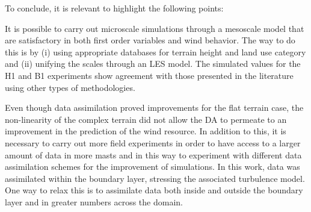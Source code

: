 To conclude, it is relevant to highlight the following points:
\begin{itemize*}
\item It is possible to carry out microscale simulations through a mesoscale model that are satisfactory in both first order variables and wind behavior. The way to do this is by (i) using appropriate databases for terrain height and land use category and (ii) unifying the scales through an LES model. The simulated values for the H1 and B1 experiments show agreement with those presented in the literature using other types of methodologies.
\item Even though data assimilation proved improvements for the flat terrain case, the non-linearity of the complex terrain did not allow the DA to permeate to an improvement in the prediction of the wind resource. In addition to this, it is necessary to carry out more field experiments in order to have access to a larger amount of data in more masts and in this way to experiment with different data assimilation schemes for the improvement of simulations. In this work, data was assimilated within the boundary layer, stressing the associated turbulence model. One way to relax this is to assimilate data both inside and outside the boundary layer and in greater numbers across the domain.
\end{itemize*}







